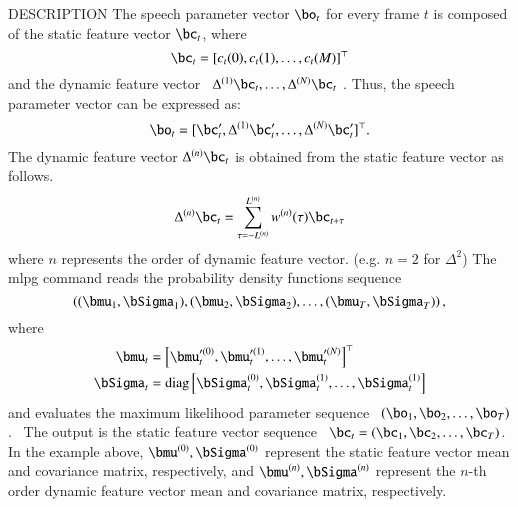 \begin{qsection}{DESCRIPTION}
        The speech parameter vector $\bo_t$ for
        every frame $t$ is composed of the static feature
        vector $\bc_t$, where 
 \begin{displaymath}
	\bc_t = [c_t(0), c_t(1), \dots, c_t(M)]^\top
 \end{displaymath}
	and the dynamic feature vector 
	\ $\Delta^{(1)}\bc_t, \dots, \Delta^{(N)}\bc_t$
	. Thus, the speech parameter vector can be expressed as:
 \begin{displaymath}
	\bo_t = [\bc_t', \Delta^{(1)}\bc_t', \dots, \Delta^{(N)}\bc_t']^\top.
 \end{displaymath}
        The dynamic feature vector $\Delta^{(n)}\bc_t$ is
        obtained from the static feature vector as follows.
 \begin{displaymath}
	\Delta^{(n)}\bc_t 
	= \sum_{\tau=-L^{(n)}}^{L^{(n)}} w^{(n)}(\tau)\bc_{t+\tau}
 \end{displaymath}
 where $n$ represents the order of dynamic feature vector.
 (e.g. $n =2$ for $\Delta^{2}$)
 The mlpg command reads the probability density functions
	sequence
\begin{displaymath}
	\left((\bmu_1, \bSigma_1), (\bmu_2, \bSigma_2), \dots, (\bmu_T, \bSigma_T)
	\right),
\end{displaymath}
where
 \begin{align}
	\bmu_t 
	& =  \left[\bmu^{\prime(0)}_t, \bmu^{\prime(1)}_t, 
		\dots, \bmu^{\prime(N)}_t\right]^\top
		\notag \\
	\bSigma_t 
	& = \diag \left[ \bSigma^{(0)}_t, \bSigma^{(1)}_t, \dots, \bSigma^{(1)}_t \right]
		\notag
 \end{align}
	and evaluates the maximum likelihood parameter sequence
	\ $(\bo_1, \bo_2, \dots, \bo_T)$.
	\ The output is the static feature vector sequence
	\  $\bc_t = (\bc_1, \bc_2, \dots, \bc_T)$.
	In the example above,
	$\bmu^{(0)}, \bSigma^{(0)}$ represent the static feature vector
        mean and covariance matrix, respectively,
        and $\bmu^{(n)}, \bSigma^{(n)}$ represent the $n$-th order dynamic
        feature vector mean and covariance matrix, respectively.
\end{qsection}

